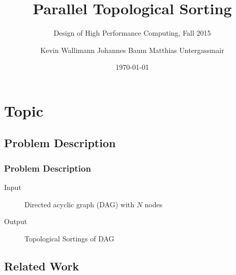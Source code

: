 

\author[]{Kevin Wallimann \quad Johannes Baum \quad Matthias Untergassmair}


\title[Topological Sorting]{Parallel Topological Sorting} %
\subtitle{Design of High Performance Computing, Fall 2015}

\date{\today} %



\begin{frame}
\titlepage %
\end{frame}


\section{Topic}

\subsection{Problem Description}

\begin{frame}
\frametitle{Problem Description}

\begin{description}
	\item[Input] Directed acyclic graph (DAG) with $N$ nodes
	\item[Output] Topological Sortings of DAG
\end{description}

\end{frame}




\subsection{Related Work}

